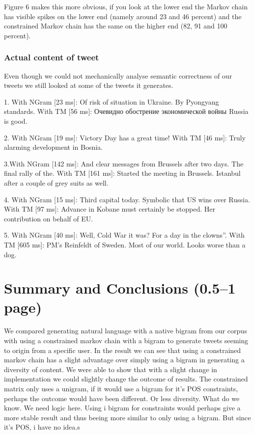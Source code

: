 \documentclass[a4paper,12pt]{article}
\begin{document}
Figure 6 makes this more obvious, if you look at the lower end the Markov chain has visible spikes on the lower end (namely around 23 and 46 percent) and the constrained Markov chain has the same on the higher end (82, 91 and 100 percent).

\subsubsection{Actual content of tweet}
Even though we could not mechanically analyse semantic correctness of our tweets we still looked at some of the tweets it generates.


1. With NGram [23 ms]:	Of risk of situation in Ukraine. By Pyongyang standards. 
With TM [56 ms]:	Очевидно обострение экономической войны Russia is good.

2. With NGram [19 ms]:	Victory Day has a great time!  
With TM [46 ms]:	Truly alarming development in Bosnia. %

3.With NGram [142 ms]:	And clear messages from Brussels after two days. The final rally of the. %
With TM [161 ms]:	Started the meeting in Brussels. Istanbul after a couple of grey suits as well.  

4. With NGram [15 ms]:	Third capital today. Symbolic that US wins over Russia. 
With TM [97 ms]:	Advance in Kobane must certainly be stopped. Her contribution on behalf of EU. 

5. With NGram [40 ms]:	Well, Cold War it was? For a day in the clowns''. 
With TM [605 ms]:	PM's Reinfeldt of Sweden. Most of our world. Looks worse than a dog. 


\newpage
\section{Summary and Conclusions (0.5--1 page)}
\label{sec:summary}
We compared generating natural language with a native bigram from our corpus with using a constrained markov chain with a bigram to generate tweets seeming to origin from a specific user.
In the result we can see that using a constrained markov chain has a slight advantage over simply using a bigram in generating a diversity of content. %
We were able to show that with a slight change in implementation we could slightly change the outcome of results. 
The constrained matrix only uses a unigram, if it would use a bigram for it's POS constraints, perhaps the outcome would have been different. Or less diversity. What do we know. We need logic here.
Using i bigram for constraints would perhaps give a more stable result and thus beeing more similar to only using a bigram. But since it's POS, i have no idea.s



\end{document}
